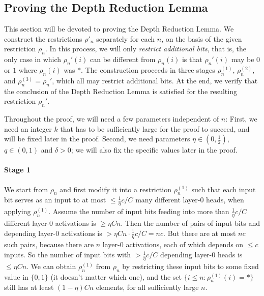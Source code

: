 \documentclass[11pt,a4paper]{article}
\begin{document}


\subsection{Proving the Depth Reduction Lemma}
This section will be devoted to proving the Depth Reduction Lemma.
We construct the restrictions $\rho'_n$ separately for each $n$, on the basis of the given restriction $\rho_n$.
In this process, we will only \emph{restrict additional bits}, that is, the only case in which $\rho_n'(i)$ can be different from $\rho_n(i)$ is that $\rho_n'(i)$ may be $0$ or $1$ where $\rho_n(i)$ was $*$.
The construction proceeds in three stages $\rho_n^{(1)}$, $\rho_n^{(2)}$, and $\rho_n^{(3)} = \rho_n'$, which all may restrict additional bits.
At the end, we verify that the conclusion of the Depth Reduction Lemma is satisfied for the resulting restriction $\rho_n'$.

Throughout the proof, we will need a few parameters independent of $n$: First, we need an integer $k$ that has to be sufficiently large for the proof to succeed, and will be fixed later in the proof.
Second, we need parameters $\eta \in (0, \frac{1}{2})$, $q \in (0,1)$ and $\delta > 0$; we will also fix the specific values later in the proof.



\paragraph{Stage 1}
We start from $\rho_n$ and first modify it into a restriction $\rho^{(1)}_n$ such that each input bit serves as an input to at most $\leq \frac{1}{\eta} c/C$ many different layer-0 heads, when applying $\rho^{(1)}_n$.
Assume the number of input bits feeding into more than $\frac{1}{\eta} c/C$ different layer-0 activations is $\geq \eta Cn$.
Then the number of pairs of input bits and depending layer-0 activations is $>\eta Cn \cdot \frac{1}{\eta} c/C = nc$.
But there are at most $nc$ such pairs, because there are $n$ layer-0 activations, each of which depends on $\leq c$ inputs.
So the number of input bits with $> \frac{1}{\eta} c/C$ depending layer-0 heads is $\leq \eta Cn$.
We can obtain $\rho^{(1)}_n$ from $\rho_n$ by restricting these input bits to some fixed value in $\{0, 1\}$ (it doesn't matter which one), and the set $\{i \leq n: \rho^{(1)}_n(i) = *\}$ still has at least $(1-\eta) C n$ elements, for all sufficiently large $n$.
\end{document}
